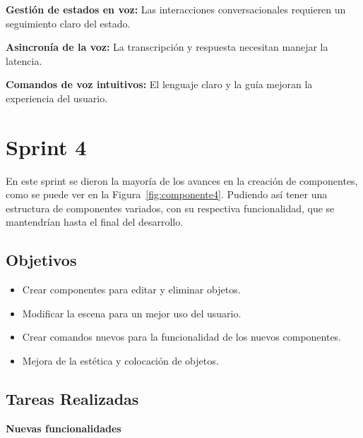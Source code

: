 \documentclass[a4paper, 12pt]{book}
\begin{document}
\textbf{Gestión de estados en voz:} Las interacciones conversacionales requieren un seguimiento claro del estado.

\textbf{Asincronía de la voz:} La transcripción y respuesta necesitan manejar la latencia.

\textbf{Comandos de voz intuitivos:} El lenguaje claro y la guía mejoran la experiencia del usuario.

\section{Sprint 4}
\label{sec:sprint4}
En este sprint se dieron la mayoría de los avances en la creación de componentes, como se puede ver en la Figura~\ref{fig:componente4}.
Pudiendo así tener una estructura de componentes variados, con su respectiva funcionalidad, que se mantendrían hasta el final del desarrollo.
\subsection{Objetivos}
\begin{itemize}
\setlength\itemsep{0.3em}  %
\setlength\parskip{0pt}    %
\item Crear componentes para editar y eliminar objetos.
\item Modificar la escena para un mejor uso del usuario.
\item Crear comandos nuevos para la funcionalidad de los nuevos componentes.
\item Mejora de la estética y colocación de objetos.
\end{itemize}
\subsection{Tareas Realizadas}
\textbf{Nuevas funcionalidades}
\end{document}
